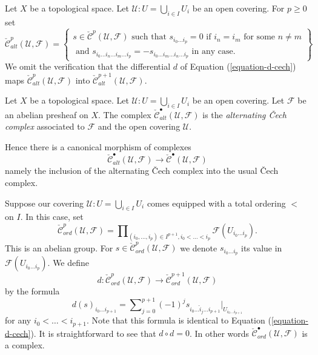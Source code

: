 \medskip\noindent
Let $X$ be a topological space. Let $\mathcal{U} : U = \bigcup_{i \in I} U_i$
be an open covering. For $p \geq 0$ set
$$
\check{\mathcal{C}}_{alt}^p(\mathcal{U}, \mathcal{F})
=
\left\{
\begin{matrix}
s \in  \check{\mathcal{C}}^p(\mathcal{U}, \mathcal{F})
\text{ such that }
s_{i_0 \ldots i_p} = 0 \text{ if } i_n = i_m \text{ for some } n \not = m\\
\text{ and }
s_{i_0\ldots i_n \ldots i_m \ldots i_p}
=
-s_{i_0\ldots i_m \ldots i_n \ldots i_p}
\text{ in any case.}
\end{matrix}
\right\}
$$
We omit the verification that the differential $d$ of
Equation (\ref{equation-d-cech}) maps
$\check{\mathcal{C}}^p_{alt}(\mathcal{U}, \mathcal{F})$ into
$\check{\mathcal{C}}^{p + 1}_{alt}(\mathcal{U}, \mathcal{F})$.

\begin{definition}
\label{definition-alternating-cech-complex}
\begin{reference}
\cite[Chapter I, \S 3, no. 18, p. 212]{FAC}
\end{reference}
Let $X$ be a topological space. Let $\mathcal{U} : U = \bigcup_{i \in I} U_i$
be an open covering. Let $\mathcal{F}$ be an abelian presheaf on $X$.
The complex $\check{\mathcal{C}}_{alt}^\bullet(\mathcal{U}, \mathcal{F})$
is the {\it alternating {\v C}ech complex} associated to $\mathcal{F}$ and the
open covering $\mathcal{U}$.
\end{definition}

\noindent
Hence there is a canonical morphism of complexes
$$
\check{\mathcal{C}}_{alt}^\bullet(\mathcal{U}, \mathcal{F})
\longrightarrow
\check{\mathcal{C}}^\bullet(\mathcal{U}, \mathcal{F})
$$
namely the inclusion of the alternating {\v C}ech complex into the
usual {\v C}ech complex.

\medskip\noindent
Suppose our covering $\mathcal{U} : U = \bigcup_{i \in I} U_i$ comes
equipped with a total ordering $<$ on $I$. In this case, set
$$
\check{\mathcal{C}}_{ord}^p(\mathcal{U}, \mathcal{F})
=
\prod\nolimits_{(i_0, \ldots, i_p) \in I^{p + 1}, i_0 < \ldots < i_p}
\mathcal{F}(U_{i_0\ldots i_p}).
$$
This is an abelian group. For
$s \in \check{\mathcal{C}}_{ord}^p(\mathcal{U}, \mathcal{F})$ we denote
$s_{i_0\ldots i_p}$ its value in $\mathcal{F}(U_{i_0\ldots i_p})$.
We define
$$
d : \check{\mathcal{C}}_{ord}^p(\mathcal{U}, \mathcal{F})
\longrightarrow
\check{\mathcal{C}}_{ord}^{p + 1}(\mathcal{U}, \mathcal{F})
$$
by the formula
$$
d(s)_{i_0\ldots i_{p + 1}}
=
\sum\nolimits_{j = 0}^{p + 1}
(-1)^j
s_{i_0\ldots \hat i_j \ldots i_{p + 1}}|_{U_{i_0\ldots i_{p + 1}}}
$$
for any $i_0 < \ldots < i_{p + 1}$. Note that this formula is identical
to Equation (\ref{equation-d-cech}).
It is straightforward to see that $d \circ d = 0$. In other words
$\check{\mathcal{C}}_{ord}^\bullet(\mathcal{U}, \mathcal{F})$ is a complex.

